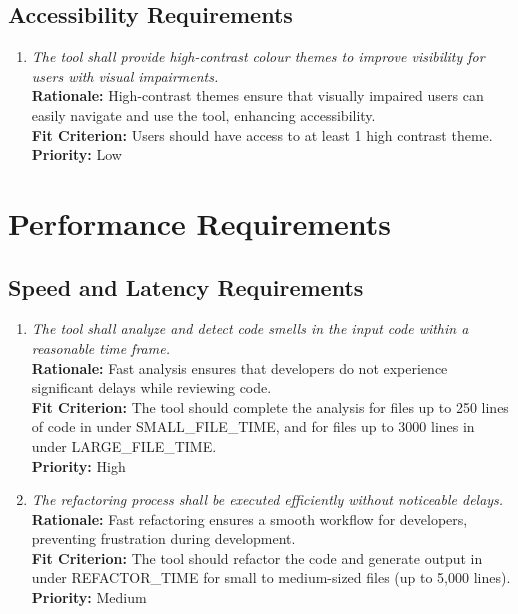 \documentclass[12pt]{article}
\begin{document}
\subsection{Accessibility Requirements}
\begin{enumerate}[label=UHR-ACS \arabic*., wide=0pt, leftmargin=*]
  \item \emph{The tool shall provide high-contrast colour themes to
    improve visibility for users with visual impairments.}\\[2mm]
    {\bf Rationale:} High-contrast themes ensure that visually
    impaired users can easily navigate and use the tool, enhancing
    accessibility.\\
    {\bf Fit Criterion:} Users should have access to at least 1 high
    contrast theme.\\
    {\bf Priority:} Low
\end{enumerate}

\section{Performance Requirements}
\subsection{Speed and Latency Requirements}
\begin{enumerate}[label=PR-SL \arabic*., wide=0pt, leftmargin=*]
  \item \emph{The tool shall analyze and detect code smells in the
    input code within a reasonable time frame.}\\[2mm]
    {\bf Rationale:} Fast analysis ensures that developers do not
    experience significant delays while reviewing code.\\
    {\bf Fit Criterion:} The tool should complete the analysis for
    files up to 250 lines of code in under SMALL\_FILE\_TIME, and
    for files up to 3000 lines in under LARGE\_FILE\_TIME.\\
    {\bf Priority:} High
  \item \emph{The refactoring process shall be executed efficiently
    without noticeable delays.}\\[2mm]
    {\bf Rationale:} Fast refactoring ensures a smooth workflow for
    developers, preventing frustration during development.\\
    {\bf Fit Criterion:} The tool should refactor the code and
    generate output in under REFACTOR\_TIME for small to medium-sized
    files (up to 5,000 lines).\\
    {\bf Priority:} Medium
\end{enumerate}
\end{document}
